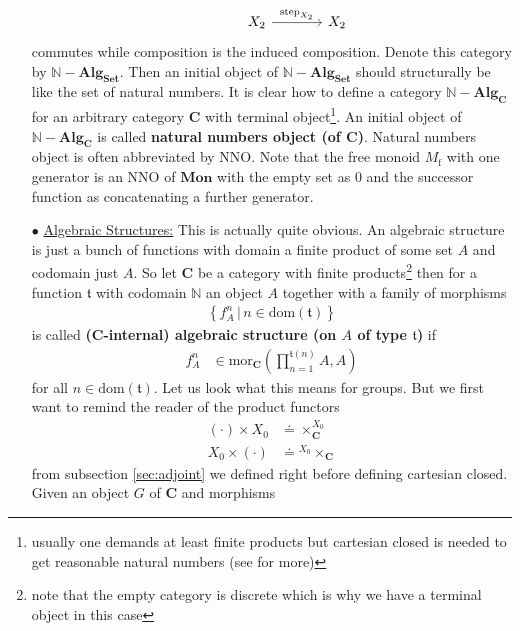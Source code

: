 \begin{exa}
\begin{enumerate}
\[\begin{tikzcd}[sep=large]
  &
  X_{2}
  \arrow{r}{\mathrm{step}_{X_{2}}}
  &
  X_{2}
\end{tikzcd}
\]
commutes while composition is the induced composition. Denote this category by $\mathbb{N}-\mathbf{Alg}_{\mathbf{Set}}$. Then an initial object of $\mathbb{N}-\mathbf{Alg}_{\mathbf{Set}}$ should structurally be like the set of natural numbers. It is clear how to define a category $\mathbb{N}-\mathbf{Alg}_{\mathbf{C}}$ for an arbitrary category $\mathbf{C}$ with terminal object\footnote{usually one demands at least finite products but cartesian closed is needed to get reasonable natural numbers (see \cite{wiki-nlab0000} for more)}. An initial object of $\mathbb{N}-\mathbf{Alg}_{\mathbf{C}}$ is called \textbf{natural numbers object (of $\mathbf{C}$)}. Natural numbers object is often abbreviated by NNO. Note that the free monoid $M_{\textrm{f}}$ with one generator is an NNO of $\mathbf{Mon}$ with the empty set as $0$ and the successor function as concatenating a further generator.
\item[$\bullet$]
\underline{Algebraic Structures:}
This is actually quite obvious. An algebraic structure is just a bunch of functions with domain a finite product of some set $A$ and codomain just $A$. So let $\mathbf{C}$ be a category with finite products\footnote{note that the empty category is discrete which is why we have a terminal object in this case} then for a function $\mathfrak{t}$ with codomain $\mathbb{N}$ an object $A$ together with a family of morphisms
\begin{align*}
  \left\lbrace
      f_{A}^{n}
    \,
    \vert
    \,
      n
      \in
      \mathrm{dom}(\mathfrak{t})
  \right\rbrace
\end{align*}
is called \textbf{($\mathbf{C}$-internal) algebraic structure (on $A$ of type $\mathfrak{t}$)} if
\begin{align*}
  f_{A}^{n}
  &\in
  \mathrm{mor}_{\mathbf{C}}
  \left(
    \prod_{n=1}^{\mathfrak{t}(n)}A,
    A
  \right)
\end{align*}
for all $n \in \mathrm{dom}(\mathfrak{t})$. Let us look what this means for groups. But we first want to remind the reader of the product functors
\begin{align*}
  (\cdot)
  \times
  X_{0}
  &\doteq
  \times_{\mathbf{C}}^{X_{0}}
  \\
  X_{0}
  \times
  (\cdot)
  &\doteq
  {}^{X_{0}}\times_{\mathbf{C}}
\end{align*}
from subsection \ref{sec:adjoint} we defined right before defining  cartesian closed. Given an object $G$ of $\mathbf{C}$ and morphisms

\end{enumerate}
\end{exa}
